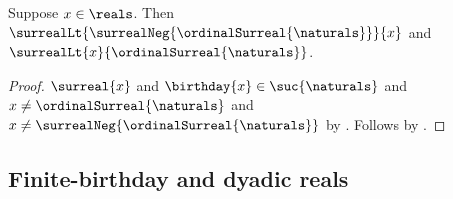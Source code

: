 \begin{corollary}\label{surreal_real_bounds}
    Suppose $x\in\reals$.
    Then
        $\surrealLt{\surrealNeg{\ordinalSurreal{\naturals}}}{x}$ and
        $\surrealLt{x}{\ordinalSurreal{\naturals}}$.
\end{corollary}
\begin{proof}
    $\surreal{x}$ and $\birthday{x}\in\suc{\naturals}$ and
        $x\neq\ordinalSurreal{\naturals}$ and
        $x\neq\surrealNeg{\ordinalSurreal{\naturals}}$
        by
        .
    Follows by
        .
\end{proof}

\subsection{Finite-birthday and dyadic reals}

